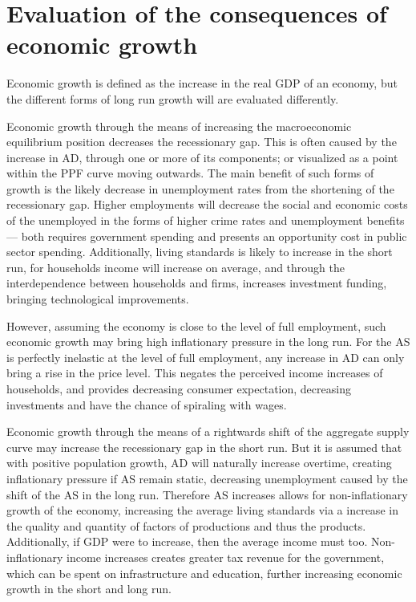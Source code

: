 \documentclass[a4paper,12pt]{article}
\begin{document}
\section{Evaluation of the consequences of economic growth}


Economic growth is defined as the increase in the real GDP of an economy, but the different forms of long run growth will are evaluated differently. 

Economic growth through the means of increasing the macroeconomic equilibrium position decreases the recessionary gap. This is often caused by the increase in AD, through one or more of its components; or visualized as a point within the PPF curve moving outwards. The main benefit of such forms of growth is the likely decrease in unemployment rates from the shortening of the recessionary gap. Higher employments will decrease the social and economic costs of the unemployed in the forms of higher crime rates and unemployment benefits --- both requires government spending and presents an opportunity cost in public sector spending. Additionally, living standards is likely to increase in the short run, for households income will increase on average, and through the interdependence between households and firms, increases investment funding, bringing technological improvements.

However, assuming the economy is close to the level of full employment, such economic growth may bring high inflationary pressure in the long run. For the AS is perfectly inelastic at the level of full employment, any increase in AD can only bring a rise in the price level. This negates the perceived income increases of households, and provides decreasing consumer expectation, decreasing investments and have the chance of spiraling with wages.

Economic growth through the means of a rightwards shift of the aggregate supply curve may increase the recessionary gap in the short run. But it is assumed that with positive population growth, AD will naturally increase overtime, creating inflationary pressure if AS remain static, decreasing unemployment caused by the shift of the AS in the long run. Therefore AS increases allows for non-inflationary growth of the economy, increasing the average living standards via a increase in the quality and quantity of factors of productions and thus the products. Additionally, if GDP were to increase, then the average income must too. Non-inflationary income increases creates greater tax revenue for the government, which can be spent on infrastructure and education, further increasing economic growth in the short and long run.
\end{document}
